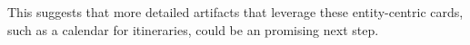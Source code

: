 \noindent This suggests that more detailed artifacts that leverage these entity-centric cards, such as a calendar for itineraries, could be an promising next step.









